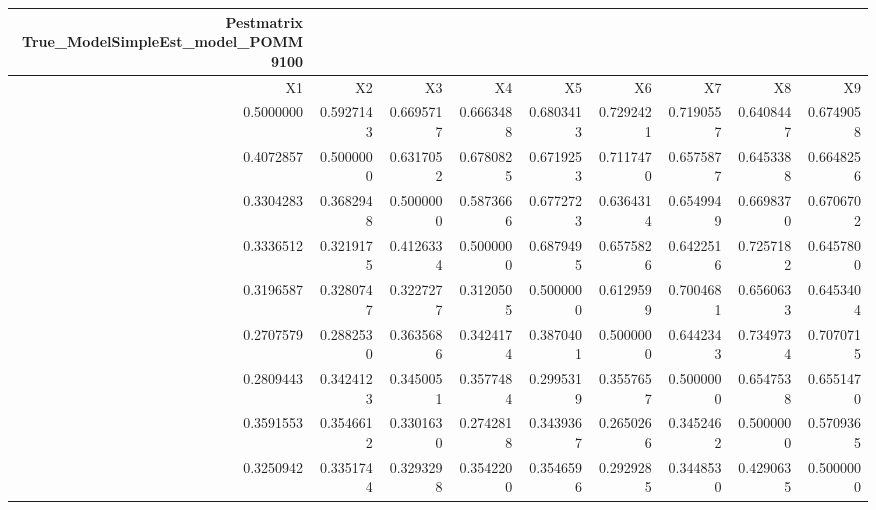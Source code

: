 \begin{longtable}{rrrrrrrrr}
\caption*{
{\large Pestmatrix} \\ 
{\small True\_ModelSimpleEst\_model\_POMM9100}
} \\ 
\toprule
X1 & X2 & X3 & X4 & X5 & X6 & X7 & X8 & X9 \\ 
\midrule
0.5000000 & 0.5927143 & 0.6695717 & 0.6663488 & 0.6803413 & 0.7292421 & 0.7190557 & 0.6408447 & 0.6749058 \\ 
0.4072857 & 0.5000000 & 0.6317052 & 0.6780825 & 0.6719253 & 0.7117470 & 0.6575877 & 0.6453388 & 0.6648256 \\ 
0.3304283 & 0.3682948 & 0.5000000 & 0.5873666 & 0.6772723 & 0.6364314 & 0.6549949 & 0.6698370 & 0.6706702 \\ 
0.3336512 & 0.3219175 & 0.4126334 & 0.5000000 & 0.6879495 & 0.6575826 & 0.6422516 & 0.7257182 & 0.6457800 \\ 
0.3196587 & 0.3280747 & 0.3227277 & 0.3120505 & 0.5000000 & 0.6129599 & 0.7004681 & 0.6560633 & 0.6453404 \\ 
0.2707579 & 0.2882530 & 0.3635686 & 0.3424174 & 0.3870401 & 0.5000000 & 0.6442343 & 0.7349734 & 0.7070715 \\ 
0.2809443 & 0.3424123 & 0.3450051 & 0.3577484 & 0.2995319 & 0.3557657 & 0.5000000 & 0.6547538 & 0.6551470 \\ 
0.3591553 & 0.3546612 & 0.3301630 & 0.2742818 & 0.3439367 & 0.2650266 & 0.3452462 & 0.5000000 & 0.5709365 \\ 
0.3250942 & 0.3351744 & 0.3293298 & 0.3542200 & 0.3546596 & 0.2929285 & 0.3448530 & 0.4290635 & 0.5000000 \\ 
\bottomrule
\end{longtable}

